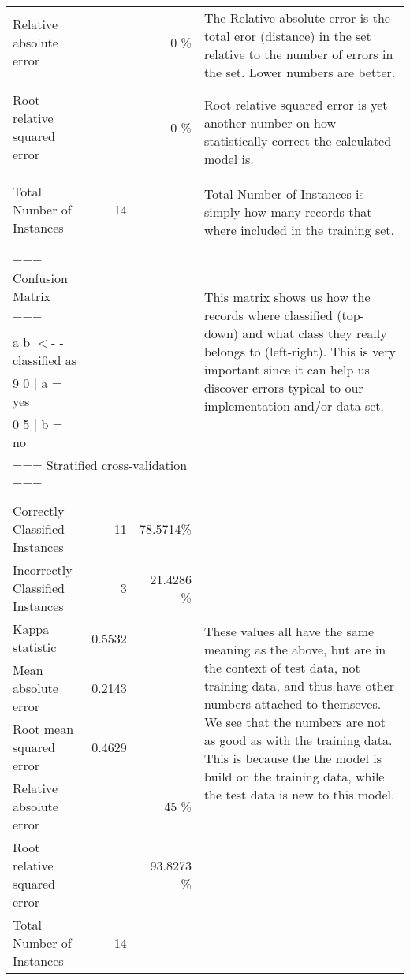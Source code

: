 \documentclass[english,a4paper]{article}
\begin{document}
\begin{longtable}{|lrr|l|}
Relative absolute error          &&        0      \%&\multirow{2}{210pt}{
The Relative absolute error is the total eror (distance) in the set relative to
the number of errors in the set. Lower numbers are better. }\\
&&&\\
&&&\\
Root relative squared error      &&        0      \%&\multirow{3}{210pt}{
Root relative squared error is yet another number on how statistically correct
the calculated model is. }\\
&&&\\
&&&\\
&&&\\
Total Number of Instances        &       14  &   &\multirow{2}{210pt}{
Total Number of Instances is simply how many records that where included in the
training set. }\\
&&&\\
&&&\\
\hline
=== Confusion Matrix ===&&&\multirow{5}{210pt}{
This matrix shows us how the records where classified (top-down) and what class
they really belongs to (left-right). This is very important since it can help
us discover errors typical to our implementation and/or data set.}\\
&&&\\
 a b   $<$- - classified as&&&\\
 9 0 $|$ a = yes&&&\\
 0 5 $|$ b = no&&&\\
 \hline
\multicolumn{3}{|l|}{=== Stratified cross-validation
===}&\multirow{10}{210pt}{These values all have the same meaning as the
above, but are in the context of test data, not training data, and thus have other
numbers attached to themseves. We see that the numbers are not as good as
with the training data. This is because the the model is build on the training
data, while the test data is new to this model. }\\
&&&\\
Correctly Classified Instances          &11       &       78.5714\%&\\
Incorrectly Classified Instances        &3        &      21.4286 \%&\\
Kappa statistic                         &0.5532&&\\
Mean absolute error                     &0.2143&&\\
Root mean squared error                 &0.4629&&\\
Relative absolute error                &&45      \%&\\
Root relative squared error            &&93.8273 \%&\\
Total Number of Instances              &14     &&\\
\hline
\end{longtable}
\end{document}
